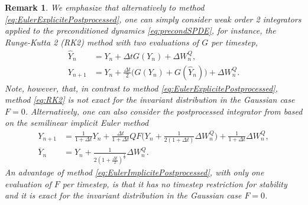 \documentclass[11pt]{amsart}
\newtheorem{remark}[theo]{Remark}
\begin{document}
\begin{remark}
We emphasize that alternatively to method \eqref{eq:EulerExplicitePostprocessed}, one can simply consider weak order 2 integrators applied to the preconditioned dynamics \eqref{eq:precondSPDE}, for instance, the Runge-Kutta 2 (RK2) method with two evaluations of $G$ per timestep,
\begin{equation}\label{eq:RK2}
\begin{aligned}
\hat{Y}_n&=Y_n+\Delta tG(Y_n)+\Delta W_n^Q,\\
Y_{n+1}&=Y_n+\frac{\Delta t}{2}\bigl(G(Y_n)+G(\hat{Y}_n)\bigr)+\Delta W_n^Q.
\end{aligned}
\end{equation}
Note, however, that, in contrast to method \eqref{eq:EulerExplicitePostprocessed}, method \eqref{eq:RK2} is not exact for the invariant distribution in the Gaussian case $F=0$.
%
Alternatively, one can also consider the postprocessed integrator from \cite{Brehier_Vilmart:16} based on the semilinear implicit Euler method
\begin{equation}\label{eq:EulerImplicitePostprocessed}
\begin{aligned}
Y_{n+1}&=\frac{1}{1+\Delta t}Y_n+\frac{\Delta t}{1+\Delta t}QF\bigl(Y_n+\frac{1}{2(1+\Delta t)}\Delta W_n^Q\bigr)+\frac{1}{1+\Delta t}\Delta W_n^Q,\\
\overline{Y}_n&=Y_n+\frac{1}{2(1+\frac{\Delta t}{2})^{\frac12}}\Delta W_n^Q.
\end{aligned}
\end{equation}
An advantage of method \eqref{eq:EulerImplicitePostprocessed}, with only one evaluation of $F$ per timestep, is that it has no timestep restriction for stability and it is exact for the invariant distribution in the Gaussian case $F=0$.
\end{remark}
\end{document}

